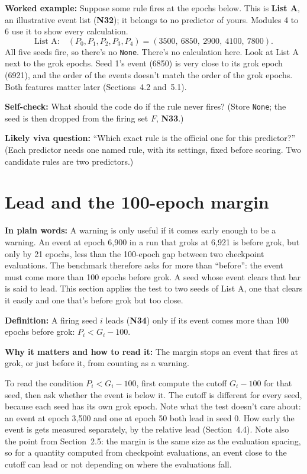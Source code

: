 \documentclass[11pt,a4paper,oneside,openany]{report}
\newcommand{\None}{\texttt{None}}
\newcommand{\gl}[1]{\textbf{#1}}   %
\newcommand{\fplain}{\textbf{In plain words:} }
\newcommand{\fdef}{\textbf{Definition:} }
\newcommand{\fread}{\par\textbf{Why it matters and how to read it:} }
\newcommand{\fex}{\par\textbf{Worked example:} }
\newcommand{\fself}{\par\textbf{Self-check:} }
\newcommand{\fviva}{\par\textbf{Likely viva question:} }
\begin{document}
\fex Suppose some rule fires at the epochs below. This is \textbf{List A}, an illustrative event list (\gl{N32}); it belongs to no predictor of yours. Modules 4 to 6 use it to show every calculation.
\[
\text{List A:}\quad (P_0, P_1, P_2, P_3, P_4) = (3500,\ 6850,\ 2900,\ 4100,\ 7800).
\]
All five seeds fire, so there's no \None. There's no calculation here.
Look at List A next to the grok epochs. Seed 1's event (6850) is very close to its grok epoch (6921), and the order of the events doesn't match the order of the grok epochs. Both features matter later (Sections~4.2 and~5.1).

\fself What should the code do if the rule never fires? (Store \None; the seed is then dropped from the firing set $F$, \gl{N33}.)
\fviva ``Which exact rule is the official one for this predictor?'' (Each predictor needs one named rule, with its settings, fixed before scoring. Two candidate rules are two predictors.)

\section{Lead and the 100-epoch margin}
\fplain A warning is only useful if it comes early enough to be a warning. An event at epoch 6{,}900 in a run that groks at 6{,}921 is before grok, but only by 21 epochs, less than the 100-epoch gap between two checkpoint evaluations. The benchmark therefore asks for more than ``before'': the event must come more than 100 epochs before grok. A seed whose event clears that bar is said to lead. This section applies the test to two seeds of List A, one that clears it easily and one that's before grok but too close.

\fdef A firing seed $i$ leads (\gl{N34}) only if its event comes more than 100 epochs before grok: $P_i < G_i - 100$.
\fread The margin stops an event that fires at grok, or just before it, from counting as a warning.

To read the condition $P_i < G_i - 100$, first compute the cutoff $G_i - 100$ for that seed, then ask whether the event is below it. The cutoff is different for every seed, because each seed has its own grok epoch. Note what the test doesn't care about: an event at epoch 3{,}500 and one at epoch 50 both lead in seed 0. How early the event is gets measured separately, by the relative lead (Section~4.4). Note also the point from Section~2.5: the margin is the same size as the evaluation spacing, so for a quantity computed from checkpoint evaluations, an event close to the cutoff can lead or not depending on where the evaluations fall.
\end{document}
